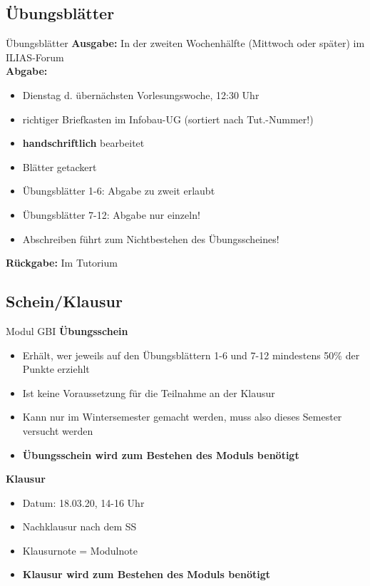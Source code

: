 \subsection{Übungsblätter}
	\begin{frame}{Übungsblätter}
		\textbf{Ausgabe:} In der zweiten Wochenhälfte (Mittwoch oder später) im ILIAS-Forum \\
		\pause
		\textbf{Abgabe:}
			\begin{itemize}
				\item Dienstag d. übernächsten Vorlesungswoche, 12:30 Uhr
				\item richtiger Briefkasten im Infobau-UG (sortiert nach Tut.-Nummer!)
				\pause
				\item \textbf{handschriftlich} bearbeitet
				\item Blätter getackert
				\item Übungsblätter 1-6: Abgabe zu zweit erlaubt
				\item Übungsblätter 7-12: Abgabe nur einzeln!
				\item Abschreiben führt zum Nichtbestehen des Übungsscheines!
			\end{itemize}
		\pause	
		\textbf{Rückgabe:} Im Tutorium
	\end{frame}
\subsection{Schein/Klausur}
 \begin{frame}{Modul GBI}
		\textbf{Übungsschein}
			\begin{itemize}
				\item Erhält, wer jeweils auf den Übungsblättern 1-6 und 7-12 mindestens 50\% der Punkte erziehlt
				\item Ist keine Voraussetzung für die Teilnahme an der Klausur
				\item Kann nur im Wintersemester gemacht werden, muss also dieses Semester versucht werden
				\item \textbf{Übungsschein wird zum Bestehen des Moduls benötigt} 
			\end{itemize}
		\pause	
		\textbf{Klausur}
		\begin{itemize}
				\item Datum: 18.03.20, 14-16 Uhr
				\item Nachklausur nach dem SS
				\item Klausurnote = Modulnote
				\item \textbf{Klausur wird zum Bestehen des Moduls benötigt} 
			\end{itemize}
	\end{frame}
	
